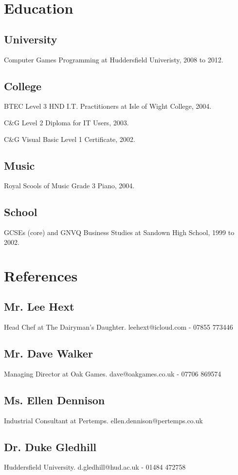 \documentclass{article}
\begin{document}
\section{Education}
\subsection{University}
Computer Games Programming at Huddersfield Univeristy, 2008 to 2012.
\subsection{College}
BTEC Level 3 HND I.T. Practitioners at Isle of Wight College, 2004.

C\&G Level 2 Diploma for IT Users, 2003.

C\&G Visual Basic Level 1 Certificate, 2002.
\subsection{Music}
Royal Scools of Music Grade 3 Piano, 2004.
\subsection{School}
GCSEs (core) and GNVQ Business Studies at Sandown High School, 1999 to 2002.

\section{References}
\subsection{Mr. Lee Hext}
Head Chef at The Dairyman's Daughter.  leehext@icloud.com - 07855 773446
\subsection{Mr. Dave Walker}
Managing Director at Oak Games.  dave@oakgames.co.uk - 07706 869574
\subsection{Ms. Ellen Dennison}
Industrial Consultant at Pertemps.  ellen.dennison@pertemps.co.uk
\subsection{Dr. Duke Gledhill}
Huddersfield University.  d.gledhill@hud.ac.uk - 01484 472758
\end{document}
